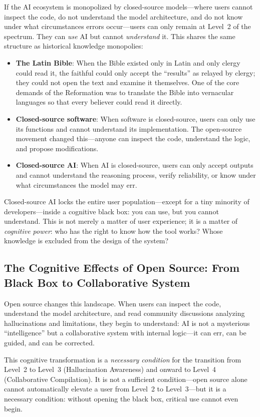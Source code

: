 ﻿\documentclass[12pt,a4paper]{article}
\begin{document}
If the AI ecosystem is monopolized by closed-source models---where users cannot inspect the code, do not understand the model architecture, and do not know under what circumstances errors occur---users can only remain at Level~2 of the spectrum. They can \emph{use} AI but cannot \emph{understand} it. This shares the same structure as historical knowledge monopolies:

\begin{itemize}
\item \textbf{The Latin Bible}: When the Bible existed only in Latin and only clergy could read it, the faithful could only accept the ``results'' as relayed by clergy; they could not open the text and examine it themselves. One of the core demands of the Reformation was to translate the Bible into vernacular languages so that every believer could read it directly.
\item \textbf{Closed-source software}: When software is closed-source, users can only use its functions and cannot understand its implementation. The open-source movement changed this---anyone can inspect the code, understand the logic, and propose modifications.
\item \textbf{Closed-source AI}: When AI is closed-source, users can only accept outputs and cannot understand the reasoning process, verify reliability, or know under what circumstances the model may err.
\end{itemize}

Closed-source AI locks the entire user population---except for a tiny minority of developers---inside a cognitive black box: you can use, but you cannot understand. This is not merely a matter of user experience; it is a matter of \emph{cognitive power}: who has the right to know how the tool works? Whose knowledge is excluded from the design of the system?

\subsection{The Cognitive Effects of Open Source: From Black Box to Collaborative System}

Open source changes this landscape. When users can inspect the code, understand the model architecture, and read community discussions analyzing hallucinations and limitations, they begin to understand: AI is not a mysterious ``intelligence'' but a collaborative system with internal logic---it can err, can be guided, and can be corrected.

This cognitive transformation is a \emph{necessary condition} for the transition from Level~2 to Level~3 (Hallucination Awareness) and onward to Level~4 (Collaborative Compilation). It is not a sufficient condition---open source alone cannot automatically elevate a user from Level~2 to Level~3---but it is a necessary condition: without opening the black box, critical use cannot even begin.
\end{document}
